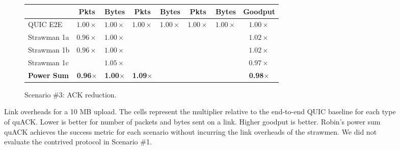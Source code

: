 \begin{figure}[ht]
\begin{subfigure}{\columnwidth}
\begin{tabular}{lccccccc}
    & \bf Pkts & \bf Bytes & \bf Pkts & \bf Bytes & \bf Pkts & \bf Bytes & \bf Goodput \\
    \midrule
    QUIC E2E & $1.00\times$ & $1.00\times$ & $1.00\times$ & $1.00\times$ & $1.00\times$ & $1.00\times$ & $1.00\times$ \\
    Strawman 1a & $0.96\times$ & $1.00\times$ & \cellcolor{LightRed}{$9.94\times$} & \cellcolor{LighterRed}{$4.99\times$} & \cellcolor{LightGreen}{$0.04\times$} & \cellcolor{LightGreen}{$0.08\times$} & $1.02\times$ \\
    Strawman 1b & $0.96\times$ & $1.00\times$ & \cellcolor{LightRed}{$9.95\times$} & \cellcolor{LightRed}{$7.13\times$}      & \cellcolor{LightGreen}{$0.04\times$} & \cellcolor{LightGreen}{$0.08\times$} & $1.02\times$ \\
    Strawman 1c & \cellcolor{LightestRed}{$1.91\times$} & $1.05\times$ & \cellcolor{LightRed}{$9.73\times$} & \cellcolor{LightRed}{$7.41\times$}      & \cellcolor{LightGreen}{$0.04\times$} & \cellcolor{LightGreen}{$0.08\times$} & $0.97\times$ \\
    \bf \textcolor{black!50!blue}{Power Sum}    & \textcolor{black!50!blue}{\bf 0.96$\times$} & \textcolor{black!50!blue}{\bf 1.00$\times$} & \textcolor{black!50!blue}{\bf 1.09$\times$} & \cellcolor{LighterRed}{\textcolor{black!50!blue}{\bf 2.56$\times$}} & \cellcolor{LightGreen}{\textcolor{black!50!blue}{\bf 0.04$\times$}} & \cellcolor{LightGreen}{\textcolor{black!50!blue}{\bf 0.08$\times$}} & \textcolor{black!50!blue}{\bf 0.98$\times$} \\
    \bottomrule
  \end{tabular}
  \caption{Scenario \#3: ACK reduction.}
  \label{tab:packet-overhead:ackr}
\end{subfigure}
\caption{Link overheads for a 10 MB upload. The cells represent the multiplier
relative to the end-to-end QUIC baseline for each type of quACK\@.
Lower is better for number of packets and bytes sent on a link.
Higher goodput is better. Robin's power sum quACK achieves the success metric
for each scenario without incurring the link overheads of the strawmen.
We did not evaluate the contrived protocol in Scenario \#1.
}
\label{tab:packet-overhead}
\end{figure}
